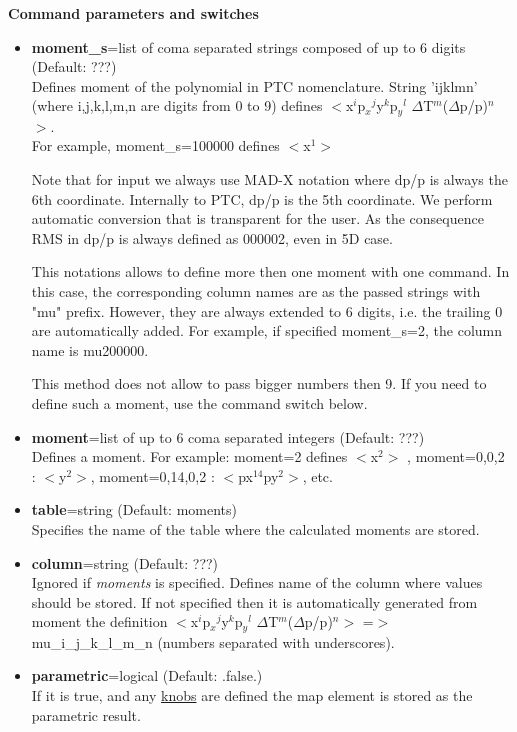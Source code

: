 {\bf Command parameters and switches}
\begin{itemize}
   \item {\bf moment\_s}=list of coma separated strings composed of up
     to 6 digits (Default: ???)\\
     Defines moment of the polynomial in PTC nomenclature. String 'ijklmn'
     (where i,j,k,l,m,n are digits from 0 to 9) defines
     $<$x$^i$p$_x$$^j$y$^k$p$_y$$^l$ $\Delta$T$^m$($\Delta$p/p)$^n$$>$. 
     \\ For example, moment\_s=100000 defines $<$x$^1$$>$ 

     Note that for input we always use MAD-X notation where dp/p is always
     the 6th coordinate. Internally to PTC, dp/p is the 5th coordinate. We
     perform automatic conversion that is transparent for the user. As the
     consequence RMS in dp/p is always defined as 000002, even in 5D case.    

     This notations allows to define more then one moment with one
     command. In this case, the corresponding column names are as the passed
     strings with "mu" prefix. However, they are always extended to 6 digits,
     i.e. the trailing 0 are automatically added. For example, if specified
     moment\_s=2, the column name is mu200000.

     This method does not allow to pass bigger numbers then 9. If you need to
     define such a moment, use the command switch below.    
     
   \item {\bf moment}=list of up to 6 coma separated integers (Default: ???)\\
     Defines a moment. For example: moment=2 defines $<$x$^2$$>$ ,
     moment=0,0,2 : $<$y$^2$$>$, moment=0,14,0,2 : $<$px$^{14}$py$^2$$>$,
     etc. 

   \item {\bf table}=string (Default: moments)\\
     Specifies the name of the table where the calculated moments are stored.   

   \item {\bf column}=string (Default: ???)\\
     Ignored if \textit{ moments } is specified. Defines name of the
     column where values should be stored. If not specified then it
     is automatically generated from moment the definition
     $<$x$^i$p$_x$$^j$y$^k$p$_y$$^l$
     $\Delta$T$^m$($\Delta$p/p)$^n$$>$ =$>$ mu\_i\_j\_k\_l\_m\_n
     (numbers separated with underscores).                  

   \item {\bf parametric}=logical (Default: .false.)\\
     If it is true, and any \href{PTC_Knob.html}{knobs} are defined the map
     element is stored as the parametric result.             
\end{itemize}

